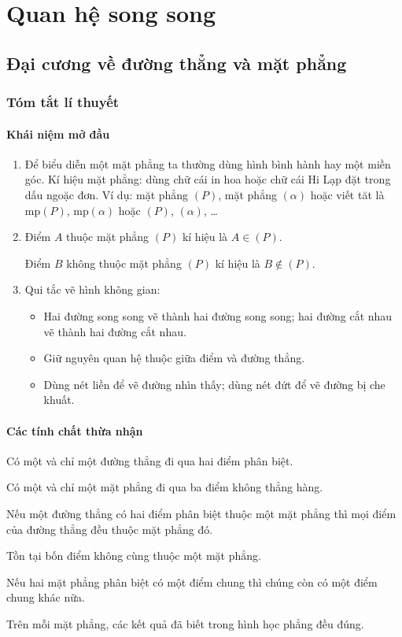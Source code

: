 \chapter{Quan hệ song song}
\section{Đại cương về đường thẳng và mặt phẳng}
\subsection{Tóm tắt lí thuyết}
\subsubsection{Khái niệm mở đầu}
\begin{enumerate}
	\item Để biểu diễn một mặt phẳng ta thường dùng hình bình hành hay một miền góc. Kí hiệu mặt phẳng: dùng chữ cái in hoa hoặc chữ cái Hi Lạp đặt trong dấu ngoặc đơn. Ví dụ: mặt phẳng $(P)$, mặt phẳng $(\alpha)$ hoặc viết tăt là mp$(P)$, mp$(\alpha)$ hoặc $(P)$, $(\alpha)$, \ldots
	\item Điểm $A$ thuộc mặt phẳng $(P)$ kí hiệu là $A\in (P)$.
	
	Điểm $B$ không thuộc mặt phẳng $(P)$ kí hiệu là $B\not\in (P)$.
	\item Qui tắc vẽ hình không gian:
	\begin{itemize}
		\item Hai đường song song vẽ thành hai đường song song; hai đường cắt nhau vẽ thành hai đường cắt nhau.
		\item Giữ nguyên quan hệ thuộc giữa điểm và đường thẳng.
		\item Dùng nét liền để vẽ đường nhìn thấy; dùng nét đứt để vẽ đường bị che khuất.
	\end{itemize}
\end{enumerate}	

\subsubsection{Các tính chất thừa nhận}
\begin{tc}
	Có một và chỉ một đường thẳng đi qua hai điểm phân biệt.	
\end{tc}
\begin{tc}
	Có một và chỉ một mặt phẳng đi qua ba điểm không thẳng hàng.	
\end{tc}
\begin{tc}
	Nếu một đường thẳng có hai điểm phân biệt thuộc một mặt phẳng thì mọi điểm của đường thẳng đều thuộc mặt phẳng đó.	
\end{tc}
\begin{tc}
	Tồn tại bốn điểm không cùng thuộc một mặt phẳng.	
\end{tc}
\begin{tc}
	Nếu hai mặt phẳng phân biệt có một điểm chung thì chúng còn có một điểm chung khác nữa.	
\end{tc}
\begin{tc}
	Trên mỗi mặt phẳng, các kết quả đã biết trong hình học phẳng đều đúng.	
\end{tc}


